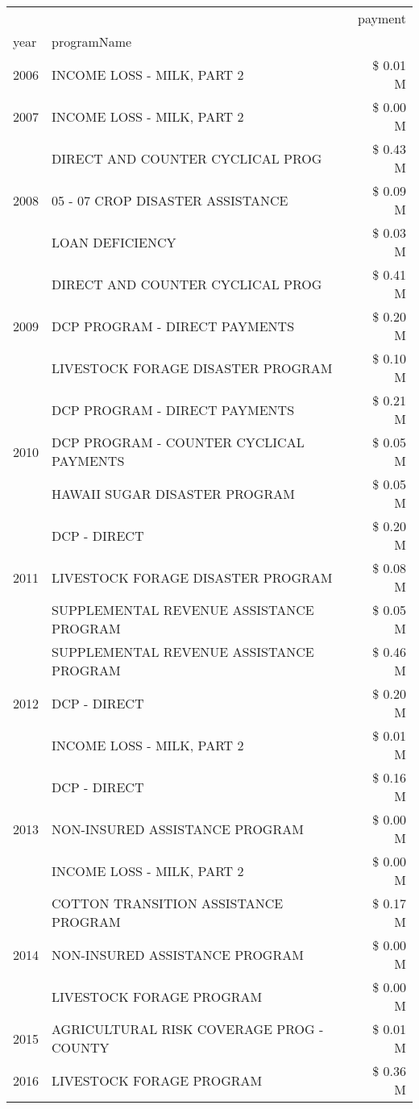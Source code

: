 \begin{tabular}{llr}
\toprule
 &  & payment \\
year & programName &  \\
\midrule
2006 & INCOME LOSS - MILK, PART 2 & \$ 0.01 M \\
\cline{1-3}
2007 & INCOME LOSS - MILK, PART 2 & \$ 0.00 M \\
\cline{1-3}
\multirow[t]{3}{*}{2008} & DIRECT AND COUNTER CYCLICAL PROG & \$ 0.43 M \\
 & 05 - 07 CROP DISASTER ASSISTANCE & \$ 0.09 M \\
 & LOAN DEFICIENCY & \$ 0.03 M \\
\cline{1-3}
\multirow[t]{3}{*}{2009} & DIRECT AND COUNTER CYCLICAL PROG & \$ 0.41 M \\
 & DCP PROGRAM - DIRECT PAYMENTS & \$ 0.20 M \\
 & LIVESTOCK FORAGE DISASTER  PROGRAM & \$ 0.10 M \\
\cline{1-3}
\multirow[t]{3}{*}{2010} & DCP PROGRAM - DIRECT PAYMENTS & \$ 0.21 M \\
 & DCP PROGRAM - COUNTER CYCLICAL PAYMENTS & \$ 0.05 M \\
 & HAWAII SUGAR DISASTER PROGRAM & \$ 0.05 M \\
\cline{1-3}
\multirow[t]{3}{*}{2011} & DCP - DIRECT & \$ 0.20 M \\
 & LIVESTOCK FORAGE DISASTER PROGRAM & \$ 0.08 M \\
 & SUPPLEMENTAL REVENUE ASSISTANCE PROGRAM & \$ 0.05 M \\
\cline{1-3}
\multirow[t]{3}{*}{2012} & SUPPLEMENTAL REVENUE ASSISTANCE PROGRAM & \$ 0.46 M \\
 & DCP - DIRECT & \$ 0.20 M \\
 & INCOME LOSS - MILK, PART 2 & \$ 0.01 M \\
\cline{1-3}
\multirow[t]{3}{*}{2013} & DCP - DIRECT & \$ 0.16 M \\
 & NON-INSURED ASSISTANCE PROGRAM & \$ 0.00 M \\
 & INCOME LOSS - MILK, PART 2 & \$ 0.00 M \\
\cline{1-3}
\multirow[t]{3}{*}{2014} & COTTON TRANSITION ASSISTANCE PROGRAM & \$ 0.17 M \\
 & NON-INSURED ASSISTANCE PROGRAM & \$ 0.00 M \\
 & LIVESTOCK FORAGE PROGRAM & \$ 0.00 M \\
\cline{1-3}
2015 & AGRICULTURAL RISK COVERAGE PROG - COUNTY & \$ 0.01 M \\
\cline{1-3}
\multirow[t]{3}{*}{2016} & LIVESTOCK FORAGE PROGRAM                      & \$ 0.36 M \\

\end{tabular}
